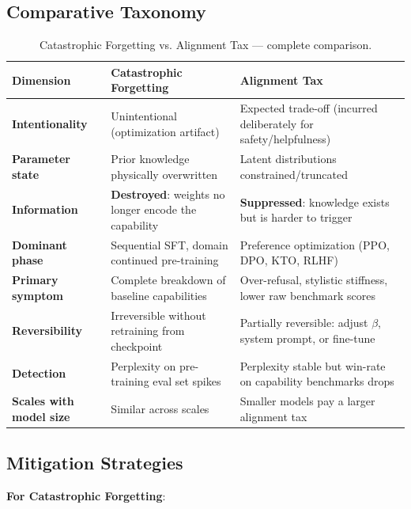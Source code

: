 \subsection{Comparative Taxonomy}
\label{comparative-taxonomy}

\begin{table}[ht!]
\centering
\caption{Catastrophic Forgetting vs. Alignment Tax --- complete comparison.}
\begin{tabular}{@{}lp{5cm}p{8cm}@{}}
\toprule
\textbf{Dimension} & \textbf{Catastrophic Forgetting} & \textbf{Alignment Tax} \\
\midrule
\textbf{Intentionality} & Unintentional (optimization artifact) & Expected trade-off (incurred deliberately for safety/helpfulness) \\
\textbf{Parameter state} & Prior knowledge physically overwritten & Latent distributions constrained/truncated \\
\textbf{Information} & \textbf{Destroyed}: weights no longer encode the capability & \textbf{Suppressed}: knowledge exists but is harder to trigger \\
\textbf{Dominant phase} & Sequential SFT, domain continued pre-training & Preference optimization (PPO, DPO, KTO, RLHF) \\
\textbf{Primary symptom} & Complete breakdown of baseline capabilities & Over-refusal, stylistic stiffness, lower raw benchmark scores \\
\textbf{Reversibility} & Irreversible without retraining from checkpoint & Partially reversible: adjust $\beta$, system prompt, or fine-tune \\
\textbf{Detection} & Perplexity on pre-training eval set spikes & Perplexity stable but win-rate on capability benchmarks drops \\
\textbf{Scales with model size} & Similar across scales & Smaller models pay a larger alignment tax \\
\bottomrule
\end{tabular}
\end{table}

\subsection{Mitigation Strategies}
\label{mitigation-strategies}

\textbf{For Catastrophic Forgetting}:

